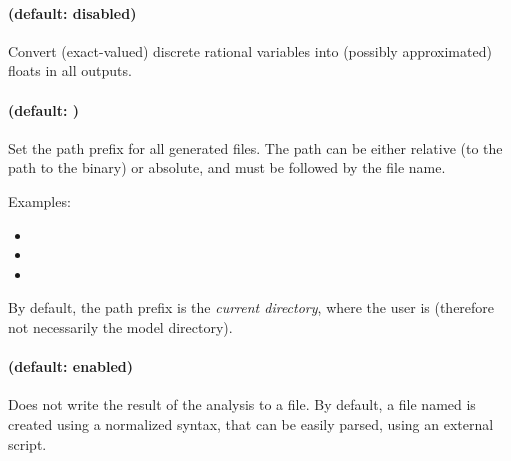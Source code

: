 \paragraph{ (default: disabled)}
Convert (exact-valued) discrete rational variables into (possibly approximated) floats in all outputs.


\paragraph{ (default: )}
Set the path prefix for all generated files.
The path can be either relative (to the path to the \stylePath{\binimitator{}} binary) or absolute, and must be followed by the file name.

Examples:
\begin{itemize}
	\item {}
	\item {}
	\item {}
\end{itemize}

By default, the path prefix is the \emph{current directory}, \ie{} where the user is (therefore not necessarily the model directory).









\paragraph{ (default: enabled)}
Does not write the result of the analysis to a file.
By default, a file named  is created using a normalized syntax, that can be easily parsed, \eg{} using an external script.



